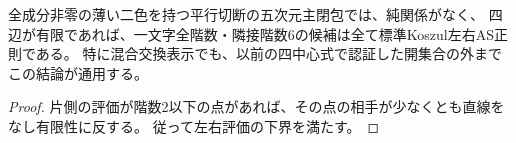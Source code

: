 \begin{corollary}\label{cor:full-thin-finite-graph-regularity}
全成分非零の薄い二色を持つ平行切断の五次元主閉包では、純関係がなく、
四辺が有限であれば、一文字全階数・隣接階数6の候補は全て標準Koszul左右AS正則である。
特に混合交換表示でも、以前の四中心式で認証した開集合の外までこの結論が通用する。
\end{corollary}
\begin{proof}
片側の評価が階数2以下の点があれば、その点の相手が少なくとも直線をなし有限性に反する。
従って左右評価の下界を満たす。
\end{proof}
